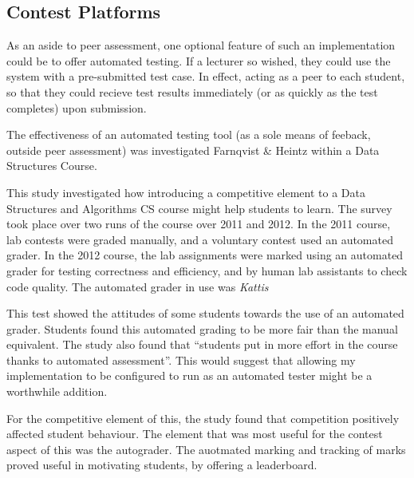 \documentclass[a4paper,11pt]{report}
\begin{document}
\subsection{Contest Platforms}
As an aside to peer assessment, one optional feature of such an implementation could be to offer automated testing. If a lecturer so wished, they could use the system with a pre-submitted test case. In effect, acting as a peer to each student, so that they could recieve test results immediately (or as quickly as the test completes) upon submission.\par
The effectiveness of an automated testing tool (as a sole means of feeback, outside peer assessment) was investigated Farnqvist \& Heintz \cite{farnqvist_competition_2016} within a Data Structures Course.\par
This study investigated how introducing a competitive element to a Data Structures and Algorithms CS course might help students to learn. The survey took place over two runs of the course over 2011 and 2012. In the 2011 course, lab contests were graded manually, and a voluntary contest used an automated grader. In the 2012 course, the lab assignments were marked using an automated grader for testing correctness and efficiency, and by human lab assistants to check code quality. The automated grader in use was \textit{Kattis} \cite{enstrom_five_2011}\par
This test showed the attitudes of some students towards the use of an automated grader. Students found this automated grading to be more fair than the manual equivalent. The study also found that ``students put in more effort in the course thanks to automated assessment''. This would suggest that allowing my implementation to be configured to run as an automated tester might be a worthwhile addition.\par
For the competitive element of this, the study found that competition positively affected student behaviour. The element that was most useful for the contest aspect of this was the autograder. The auotmated marking and tracking of marks proved useful in motivating students, by offering a leaderboard.\par
\end{document}

